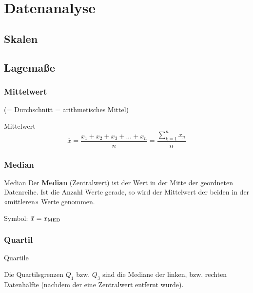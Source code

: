 \hrulefill
\section*{Datenanalyse}

\subsection*{Skalen}
\vspace{5mm}


\hrulefill
\begin{multicols}{2}

\subsection*{Lagemaße}
\subsubsection*{Mittelwert}
(= Durchschnitt = arithmetisches Mittel)

\begin{definition*}{Mittelwert}{}
$$\overline{x} = \frac{x_1 + x_2 + x_3 + ... + x_n}{n}= \frac{\sum_{k=1}^nx_n}n$$
\end{definition*}

\subsubsection*{Median}
\begin{definition*}{Median}{}
Der \textbf{Median} (Zentralwert) ist der Wert in der Mitte der geordneten Datenreihe. Ist
die Anzahl Werte gerade, so wird der Mittelwert der beiden in der
«mittleren» Werte genommen.

Symbol: $\widetilde{x} = x_{\textrm{MED}}$
\end{definition*}

\subsubsection*{Quartil}

\begin{rezept*}{Quartile}{}

Die Quartilsgrenzen $Q_1$ bzw. $Q_3$ sind die Mediane der linken,
bzw. rechten Datenhälfte (nachdem der eine Zentralwert entfernt
wurde).


\end{rezept*}
\end{multicols}
